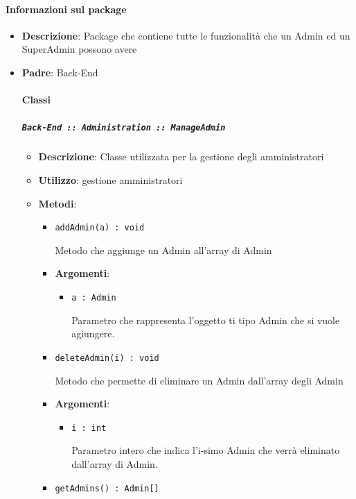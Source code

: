 \documentclass[../DefinizioneDiProdotto.tex]{subfiles}
\begin{document}
	\paragraph{Informazioni sul package}\begin{itemize}\item \textbf{Descrizione}: Package che contiene tutte le funzionalità che un Admin ed un SuperAdmin possono avere\item \textbf{Padre}: Back-End\paragraph{Classi}
	\subparagraph{\texttt{Back-End :: Administration :: ManageAdmin}}
	\begin{itemize}\item \textbf{Descrizione}: Classe utilizzata per la gestione degli amministratori
	\item \textbf{Utilizzo}: gestione amministratori
	\item \textbf{Metodi}:
	\begin{itemize}
	\item \texttt{addAdmin(a) : void}\

	 Metodo che aggiunge un Admin all'array di Admin

	\item \textbf{Argomenti}:
	\begin{itemize}
	\item \texttt{a : Admin}\

	 Parametro che rappresenta l'oggetto ti tipo Admin che si vuole agiungere.
	\end{itemize}
	\end{itemize}\vspace{0.5em}
	\begin{itemize}
	\item \texttt{deleteAdmin(i) : void}\

	 Metodo che permette di eliminare un Admin dall'array degli Admin

	\item \textbf{Argomenti}:
	\begin{itemize}
	\item \texttt{i : int}\

	 Parametro intero che indica l'i-simo Admin che verrà eliminato dall'array di Admin.
	\end{itemize}
	\end{itemize}\vspace{0.5em}
	\begin{itemize}
	\item \texttt{getAdmins() : Admin[]}\


\end{itemize}
\end{itemize}
\end{itemize}
\end{document}
